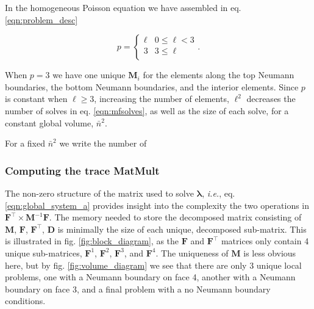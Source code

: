 \begin{aside}
	In the homogeneous Poisson equation we have assembled in 
	eq. \eqref{eqn:problem_desc}

	\begin{equation}
		p = \begin{cases}
		    \ell &  0 \leq \ell < 3 \\ 
			3 &  3 \leq \ell \\ 
		\end{cases}.
	\end{equation} 

	\noindent 
	When $p = 3$ we have one unique $\textbf{M}_i$ for the elements 
	along the top Neumann boundaries, the bottom Neumann boundaries, 
	and the interior elements. Since $p$ is constant when 
	$\ell \geq 3$, increasing the number of elements, $\ell^2$ decreases the number of solves in eq. \eqref{eqn:mfsolves}, as well as the size of each solve, for a constant global volume, $\bar{n}^2$. 
\end{aside}

For a fixed $\bar{n}^2$ we write the number of 

\subsubsection{Computing the trace MatMult} %

The non-zero structure of the matrix used to solve $\symbf{\lambda}$, 
\emph{i.e.}, eq. \eqref{eqn:global_system_a} provides insight into the complexity the two operations in $\textbf{F}^{\intercal} \times \textbf{M}^{-1} \textbf{F}$. The memory needed to store the decomposed matrix consisting of $\textbf{M}$, $\textbf{F}$, $\textbf{F}^{\intercal}$, $\textbf{D}$ is minimally the size of each unique, decomposed sub-matrix. This is illustrated in fig. \ref{fig:block_diagram}, as the $\textbf{F}$ and $\textbf{F}^{\intercal}$ matrices only contain 4 unique sub-matrices, $\textbf{F}^{1}$, $\textbf{F}^{2}$, $\textbf{F}^{3}$, and $\textbf{F}^{4}$. The uniqueness of $\textbf{M}$ is less obvious here, but by fig. \ref{fig:volume_diagram} we see that there are only 3 unique local problems, one with a Neumann boundary on face 4, another with a Neumann boundary on face 3, and a final problem with a no Neumann boundary conditions.


